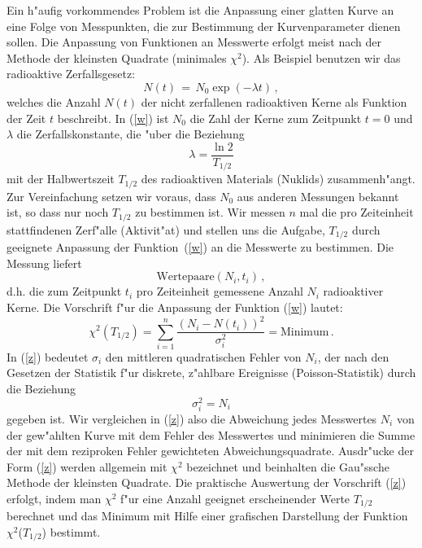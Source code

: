 Ein h"aufig vorkommendes Problem ist die Anpassung einer glatten
Kurve an eine Folge von Messpunkten, die zur Bestimmung der
Kurvenparameter dienen sollen. Die Anpassung von Funktionen an
Messwerte erfolgt meist nach der Methode der kleinsten Quadrate
(minimales $\chi^2$). Als Beispiel benutzen wir das radioaktive
Zerfallsgesetz:
%
\begin{equation} \label{w}
  N(t)\,=\,N_{0} \exp(-\lambda t) \, ,
\end{equation}
%
welches die Anzahl $N(t)$ der nicht zerfallenen
radioaktiven Kerne als Funktion der Zeit $t$ beschreibt. In
(\ref{w}) ist $N_0$ die Zahl der Kerne zum Zeitpunkt $t=0$ und
$\lambda$ die Zerfallskonstante, die "uber die Beziehung
%
\begin{equation} \label{x}
  \lambda = \frac{\ln 2}{T_{1/2}}
\end{equation}
%
mit der Halbwertszeit $T_{1/2}$ des radioaktiven Materials
(Nuklids) zusammenh"angt. Zur Vereinfachung setzen wir voraus, dass
$N_0$ aus anderen Messungen bekannt ist, so dass nur noch
$T_{1/2}$ zu bestimmen ist. Wir messen $n$ mal die pro Zeiteinheit
stattfindenen Zerf"alle (Aktivit"at) und stellen uns die Aufgabe,
$T_{1/2}$ durch geeignete Anpassung der Funktion~(\ref{w}) an die
Messwerte zu bestimmen. Die Messung liefert
%
\begin{equation} \label{y}
 \mbox{Wertepaare} (N_i, t_i) \, ,
\end{equation}
%
d.h. die zum Zeitpunkt $t_i$ pro Zeiteinheit gemessene Anzahl
$N_i$ radioaktiver Kerne. Die Vorschrift f"ur die Anpassung der
Funktion (\ref{w}) lautet:
%
\begin{equation} \label{z}
  \chi^{2}(T_{1/2}) =
    \sum_{i=1}^{n} \frac{(N_{i}-N(t_{i}))^{2}}{\sigma_{i}^{2}} = \mbox{Minimum} \, .
\end{equation}
%
In (\ref{z}) bedeutet $\sigma_i$ den mittleren quadratischen
Fehler von $N_i$, der nach den Gesetzen der Statistik f"ur
diskrete, z"ahlbare Ereignisse
(Poisson-Statistik) durch die Beziehung
\cite{tbstat}
%
\begin{equation} \label{aa}
  \sigma_i^2 = N_i
\end{equation}
%
gegeben ist. Wir vergleichen in (\ref{z}) also die Abweichung jedes
Messwertes $N_i$ von der gew"ahlten Kurve mit dem Fehler des
Messwertes und minimieren die Summe der mit dem reziproken Fehler
gewichteten Abweichungsquadrate.
Ausdr"ucke der Form (\ref{z}) werden allgemein mit $\chi^2$
bezeichnet und beinhalten die Gau"ssche Methode der kleinsten
Quadrate. Die praktische Auswertung der Vorschrift (\ref{z})
erfolgt, indem man $\chi^2$ f"ur eine Anzahl geeignet erscheinender
Werte $T_{1/2}$ berechnet und das Minimum mit Hilfe einer grafischen
Darstellung der Funktion $\chi^2$($T_{1/2}$) bestimmt.